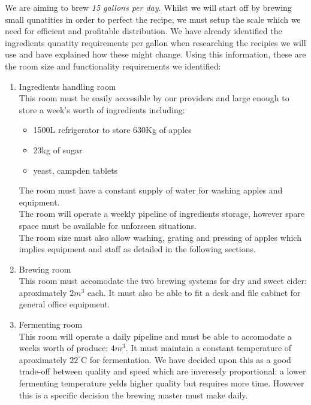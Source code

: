 \documentclass[11pt]{article}
\begin{document}
\noindent We are aiming to brew \emph{15 gallons per day}. Whilst we will start off by brewing small qunatities in order to perfect the recipe, we must setup the scale which we need for efficient and profitable distribution. We have already identified the ingredients qunatity requirements per gallon when researching the recipies we will use and have explained how these might change. Using this information, these are the room size and functionality requirements we identified: \\

  \begin{enumerate}
  \item Ingredients handling room \\
  This room must be easily accessible by our providers and large enough to store a week's worth of ingredients including:
    \begin{itemize}
    \item 1500L refrigerator to store 630Kg of apples
    \item 23kg of sugar
    \item yeast, campden tablets
    \end{itemize}
  The room must have a constant supply of water for washing apples and equipment. \\
  The room will operate a weekly pipeline of ingredients storage, however spare space must be available for unforseen situations.\\
  The room size must also allow washing, grating and pressing of apples which implies equipment and staff as detailed in the following sections.

  \item Brewing room \\
  This room must accomodate the two brewing systems for dry and sweet cider: aproximately $2m^3$ each. It must also be able to fit a desk and file cabinet for general office equipment.
  \item Fermenting room \\
  This room will operate a daily pipeline and must be able to accomodate a weeks worth of produce: $4m^3$. It must maintain a constant temperature of aproximately $22^\circ$C for fermentation. We have decided upon this as a good trade-off between quality and speed which are inveresely proportional: a lower fermenting temperature yelds higher quality but requires more time. However this is a specific decision the brewing master must make daily.


\end{enumerate}
\end{document}
